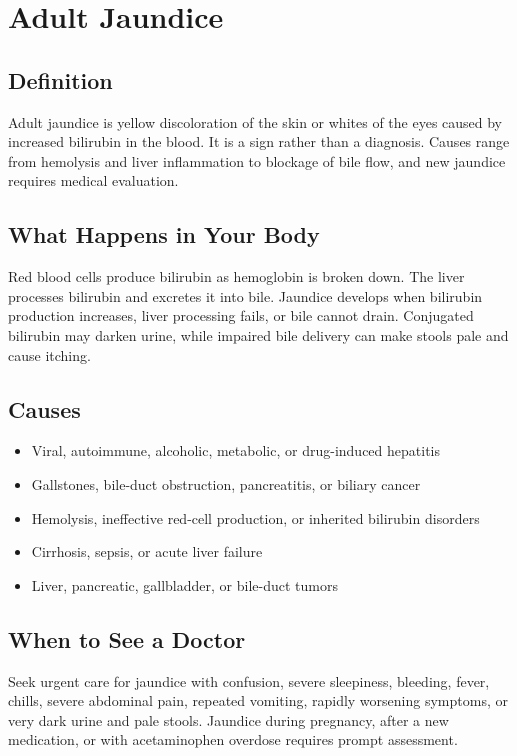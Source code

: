 \chapter{Adult Jaundice}

\section*{Definition}
Adult jaundice is yellow discoloration of the skin or whites of the eyes caused by increased bilirubin in the blood. It is a sign rather than a diagnosis. Causes range from hemolysis and liver inflammation to blockage of bile flow, and new jaundice requires medical evaluation.

\section*{What Happens in Your Body}
Red blood cells produce bilirubin as hemoglobin is broken down. The liver processes bilirubin and excretes it into bile. Jaundice develops when bilirubin production increases, liver processing fails, or bile cannot drain. Conjugated bilirubin may darken urine, while impaired bile delivery can make stools pale and cause itching.

\section*{Causes}
\begin{itemize}
  \item Viral, autoimmune, alcoholic, metabolic, or drug-induced hepatitis
  \item Gallstones, bile-duct obstruction, pancreatitis, or biliary cancer
  \item Hemolysis, ineffective red-cell production, or inherited bilirubin disorders
  \item Cirrhosis, sepsis, or acute liver failure
  \item Liver, pancreatic, gallbladder, or bile-duct tumors
\end{itemize}

\section*{When to See a Doctor}
Seek urgent care for jaundice with confusion, severe sleepiness, bleeding, fever, chills, severe abdominal pain, repeated vomiting, rapidly worsening symptoms, or very dark urine and pale stools. Jaundice during pregnancy, after a new medication, or with acetaminophen overdose requires prompt assessment.

